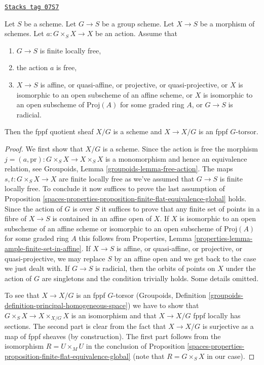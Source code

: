\begin{lemma}
\label{spaces-properties-lemma-quotient-scheme}
\href{https://stacks.math.columbia.edu/tag/07S7}{\texttt{Stacks tag 07S7}}

Let $S$ be a scheme. Let $G \to S$ be a group scheme. Let $X \to S$ be
a morphism of schemes. Let $a : G \times_S X \to X$ be an action. Assume that
\begin{enumerate}
\item $G \to S$ is finite locally free,
\item the action $a$ is free,
\item $X \to S$ is affine, or quasi-affine, or projective, or
quasi-projective, or $X$ is isomorphic to an open subscheme of an
affine scheme, or $X$ is isomorphic to an open subscheme of $\text{Proj}(A)$
for some graded ring $A$, or $G \to S$ is radicial.
\end{enumerate}
Then the fppf quotient sheaf $X/G$ is a scheme and $X \to X/G$
is an fppf $G$-torsor.
\end{lemma}

\begin{proof}
We first show that $X/G$ is a scheme. Since the action is free the morphism
$j = (a, \text{pr}) : G \times_S X \to X \times_S X$
is a monomorphism and hence an equivalence relation, see
Groupoids, Lemma \ref{groupoids-lemma-free-action}. The maps
$s, t : G \times_S X \to X$
are finite locally free as we've assumed that $G \to S$ is finite locally
free. To conclude it now suffices to prove the last assumption of
Proposition \ref{spaces-properties-proposition-finite-flat-equivalence-global} holds.
Since the action of $G$ is over $S$ it suffices to prove that
any finite set of points in a fibre of $X \to S$ is contained in an
affine open of $X$. If $X$ is isomorphic to an open subscheme of an
affine scheme or isomorphic to an open subscheme of $\text{Proj}(A)$
for some graded ring $A$ this follows from
Properties, Lemma \ref{properties-lemma-ample-finite-set-in-affine}.
If $X \to S$ is affine, or quasi-affine, or projective, or
quasi-projective, we may replace $S$ by an affine open and we
get back to the case we just dealt with. If $G \to S$ is radicial,
then the orbits of points on $X$ under the action of $G$ are singletons
and the condition trivially holds. Some details omitted.

\medskip\noindent
To see that $X \to X/G$ is an fppf $G$-torsor
(Groupoids, Definition \ref{groupoids-definition-principal-homogeneous-space})
we have to show that $G \times_S X \to X \times_{X/G} X$
is an isomorphism and that $X \to X/G$ fppf locally has sections.
The second part is clear from the fact that $X \to X/G$ is surjective
as a map of fppf sheaves (by construction). The first part follows from
the isomorphism $R = U \times_M U$ in the conclusion of
Proposition \ref{spaces-properties-proposition-finite-flat-equivalence-global}
(note that $R = G \times_S X$ in our case).
\end{proof}

